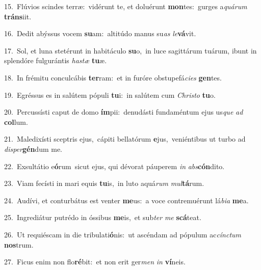 {\numbfont\textcolor{\numbcolor}{15.}}~Flúvios scindes terræ:~\dagger vidérunt te, et doluérunt \textbf{mon}\-tes:~\star gurges a\-\textit{quá}\-\textit{rum} \textbf{tráns}\-iit.\par
{\numbfont\textcolor{\numbcolor}{16.}}~Dedit abýssus vocem \textbf{su}\-am:~\star altitúdo manus su\textit{as} \textit{le}\-\textbf{vá}vit.\par
{\numbfont\textcolor{\numbcolor}{17.}}~Sol, et luna stetérunt in habitáculo \textbf{su}\-o,~\star in luce sagittárum tuárum, ibunt in splendóre fulgurántis \textit{has}\-\textit{tæ} \textbf{tu}\-æ.\par
{\numbfont\textcolor{\numbcolor}{18.}}~In frémitu conculcábis \textbf{ter}\-ram:~\star et in furóre obstupefá\-\textit{ci}\-\textit{es} \textbf{gen}\-tes.\par
{\numbfont\textcolor{\numbcolor}{19.}}~Egréssus es in salútem pópuli \textbf{tu}\-i:~\star in salútem cum \textit{Chris}\-\textit{to} \textbf{tu}\-o.\par
{\numbfont\textcolor{\numbcolor}{20.}}~Percussísti caput de domo \textbf{ím}\-pii:~\star denudásti fundaméntum ejus us\textit{que} \textit{ad} \textbf{col}\-lum.\par
{\numbfont\textcolor{\numbcolor}{21.}}~Maledixísti sceptris ejus,~\dagger cápiti bellatórum \textbf{e}\-jus,~\star veniéntibus ut turbo ad \textit{di}\-\textit{sper}\textbf{gén}dum me.\par
{\numbfont\textcolor{\numbcolor}{22.}}~Exsultátio e\-\textbf{ó}\-rum~\star sicut ejus, qui dévorat páuperem \textit{in} \textit{abs}\-\textbf{cón}dito.\par
{\numbfont\textcolor{\numbcolor}{23.}}~Viam fecísti in mari equis \textbf{tu}\-is,~\star in luto aquá\textit{rum} \textit{mul}\-\textbf{tá}rum.\par
{\numbfont\textcolor{\numbcolor}{24.}}~Audívi, et conturbátus est venter \textbf{me}\-us:~\star a voce contremuérunt lá\-\textit{bi}\-\textit{a} \textbf{me}\-a.\par
{\numbfont\textcolor{\numbcolor}{25.}}~Ingrediátur putrédo in óssibus \textbf{me}\-is,~\star et sub\textit{ter} \textit{me} \textbf{scá}\-teat.\par
{\numbfont\textcolor{\numbcolor}{26.}}~Ut requiéscam in die tribulati\-\textbf{ó}\-nis:~\star ut ascéndam ad pópulum ac\-\textit{cínc}\-\textit{tum} \textbf{nos}\-trum.\par
{\numbfont\textcolor{\numbcolor}{27.}}~Ficus enim non flo\-\textbf{ré}\-bit:~\star et non erit ger\textit{men} \textit{in} \textbf{ví}\-neis.\par
